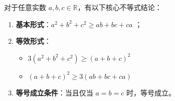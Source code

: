 \begin{statementbox}
对于任意实数 $a, b, c \in \mathbb{R}$，有以下核心不等式结论：
\begin{enumerate}
    \item \textbf{基本形式}：$a^2 + b^2 + c^2 \geqslant ab + bc + ca$ ；
    \item \textbf{等效形式}：
    \begin{itemize}
        \item $3(a^2 + b^2 + c^2) \geqslant (a+b+c)^2$
        \item $(a+b+c)^2 \geqslant 3(ab + bc + ca)$
    \end{itemize}
    \item \textbf{等号成立条件}：当且仅当 $a = b = c$ 时，等号成立。
\end{enumerate}
\end{statementbox}
